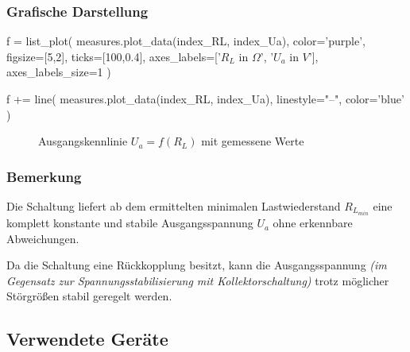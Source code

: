\documentclass[a4paper]{hitec}
\begin{document}
\subsubsection{Grafische Darstellung}

\begin{sagesilent}
    f = list_plot(
        measures.plot_data(index_RL, index_Ua),
        color='purple',
        figsize=[5,2],
        ticks=[100,0.4],
        axes_labels=['$R_L$ in $\Omega$', '$U_a$ in $V$'],
        axes_labels_size=1
    )

    f += line(
        measures.plot_data(index_RL, index_Ua),
        linestyle="--",
        color='blue'
    )
\end{sagesilent}

\begin{figure}[H]
    \centering
    \caption{Ausgangskennlinie \textbf{$U_{a} = f(R_L)$} mit gemessene Werte}
    \label{fig:measure2}
\end{figure}

\subsubsection{Bemerkung}

Die Schaltung liefert ab dem ermittelten minimalen Lastwiederstand $R_{L_{min}}$ eine komplett konstante und stabile Ausgangsspannung $U_{a}$ ohne erkennbare Abweichungen.

Da die Schaltung eine Rückkopplung besitzt, kann die Ausgangsspannung \textit{(im Gegensatz zur Spannungsstabilisierung mit Kollektorschaltung)} trotz möglicher Störgrößen stabil geregelt werden.

\subsection{Verwendete Geräte}

\begin{devicelist}
\end{devicelist}

\clearpage

\IncludeHistoryTimeline

\clearpage




\end{document}
